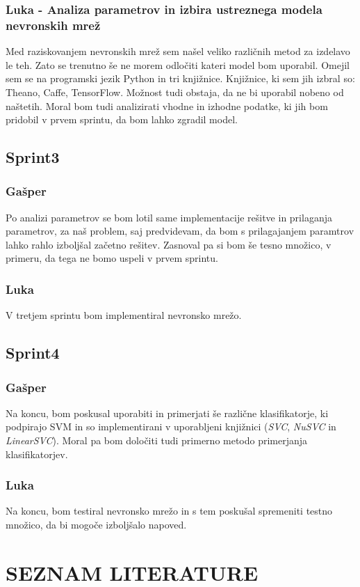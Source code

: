 \documentclass[a4paper,11pt]{article}
\begin{document}
\subsubsection{Luka - Analiza parametrov in izbira ustreznega modela nevronskih mrež}
Med raziskovanjem nevronskih mrež sem našel veliko različnih metod za izdelavo le teh. Zato se trenutno še ne morem odločiti kateri model bom uporabil. Omejil sem se na programski jezik Python in tri knjižnice. Knjižnice, ki sem jih izbral so: Theano, Caffe, TensorFlow. Možnost tudi obstaja, da ne bi uporabil nobeno od naštetih. Moral bom tudi analizirati vhodne in izhodne podatke, ki jih bom pridobil v prvem sprintu, da bom lahko zgradil model.

\subsection{Sprint3}
\subsubsection{Gašper}
Po analizi parametrov se bom lotil same implementacije rešitve in prilaganja parametrov, za naš problem, saj predvidevam, da bom s prilagajanjem paramtrov lahko rahlo izboljšal začetno rešitev. Zasnoval pa si bom še tesno množico, v primeru, da tega ne bomo uspeli v prvem sprintu.

\subsubsection{Luka}
V tretjem sprintu bom implementiral nevronsko mrežo.

\subsection{Sprint4}
\subsubsection{Gašper}
Na koncu, bom poskusal uporabiti in primerjati še različne klasifikatorje, ki podpirajo SVM in so implementirani v uporabljeni knjižnici (\textit{SVC}, \textit{NuSVC} in \textit{LinearSVC}). Moral pa bom določiti tudi primerno metodo primerjanja klasifikatorjev.

\subsubsection{Luka}
Na koncu, bom testiral nevronsko mrežo in s tem poskušal spremeniti testno množico, da bi mogoče izboljšalo napoved.

\newpage
\section{SEZNAM LITERATURE}{\baselineskip=-8pt}
\vspace{-36pt}
\renewcommand{\refname}{}
\nocite{*}

\end{document}

